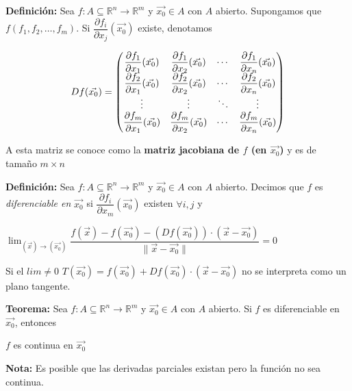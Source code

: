 \documentclass[12pt]{article}
\begin{document}
\newpage
\noindent \textbf{Definición: } Sea $f:A\subseteq\mathbb{R}^n\rightarrow\mathbb{R}^m$ y $\vec{x_0}\in A$ con $A$ abierto. 
Supongamos que $f(f_1,f_2, \dots, f_m)$. Si $\dfrac{\partial{f_i}}{\partial{x_j}}{(\vec{x_0})}$ existe, denotamos
\begin{center}
    \begin{equation}\notag
        Df(\vec{x_0})=
        \begin{pmatrix}
        \dfrac{\partial{f_1}}{\partial{x_1}}{(\vec{x_0})} & \dfrac{\partial{f_1}}{\partial{x_2}}{(\vec{x_0})}& \cdots & \dfrac{\partial{f_1}}{\partial{x_n}}{(\vec{x_0})}\\
        \dfrac{\partial{f_2}}{\partial{x_1}}{(\vec{x_0})} & \dfrac{\partial{f_2}}{\partial{x_2}}{(\vec{x_0})} & \cdots & \dfrac{\partial{f_2}}{\partial{x_n}}{(\vec{x_0})}\\
        \vdots & \vdots & \ddots & \vdots\\
        \dfrac{\partial{f_m}}{\partial{x_1}}{(\vec{x_0})} & \dfrac{\partial{f_m}}{\partial{x_2}}{(\vec{x_0})}& \cdots & \dfrac{\partial{f_m}}{\partial{x_n}}{(\vec{x_0})}
        \end{pmatrix}
        \end{equation}
\end{center}
\noindent A esta matriz se conoce como la \textbf{matriz jacobiana de $f$ (en $\vec{x_0}$)} y es de tamaño $m\times n$

\noindent \textbf{Definición: }Sea $f:A\subseteq\mathbb{R}^n\rightarrow\mathbb{R}^m$ y $\vec{x_0}\in A$ con $A$ abierto. Decimos que 
$f$ es \emph{diferenciable en} $\vec{x_0}$ si $\dfrac{\partial{f_i}}{\partial{x_m}}{(\vec{x_0})}$ existen $\forall i,j$ y 
\begin{center}
    ${\lim_{(\vec{x})\rightarrow(\vec{x_0})}{\dfrac{f(\vec{x})-f(\vec{x_0})-\left(Df(\vec{x_0})\right)\cdot\left(\vec{x}-\vec{x_0}\right)}{\|\vec{x}-\vec{x_0}\|}}=0}$
\end{center}
\noindent Si el $lim\not=0$ $T(\vec{x_0})=f(\vec{x_0})+ Df(\vec{x_0})\cdot (\vec{x}-\vec{x_0})$ no se interpreta como un plano tangente.

\noindent \textbf{Teorema: }Sea $f:A\subseteq\mathbb{R}^n\rightarrow\mathbb{R}^m$ y $\vec{x_0}\in A$ con $A$ abierto. Si $f$ es diferenciable en $\vec{x_0}$, entonces
\begin{center}
    $f$ es continua en $\vec{x_0}$
\end{center}

\noindent \textbf{Nota: }Es posible que las derivadas parciales existan pero la función no sea continua.
\end{document}
